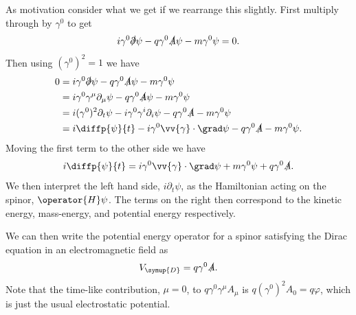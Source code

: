 \documentclass[fleqn]{NotesClass}
\newcommand{\dirac}{\symup{D}}
\begin{document}
    As motivation consider what we get if we rearrange this slightly.
    First multiply through by \(\gamma^0\) to get
    \begin{equation}
        i\gamma^0 \slashed{\partial}\psi - q\gamma^0\slashed{A}\psi - m\gamma^0\psi = 0.
    \end{equation}
    Then using \((\gamma^0)^2 = 1\) we have
    \begin{align}
        0 &= i\gamma^0\slashed{\partial}\psi - q\gamma^0\slashed{A}\psi - m\gamma^0\psi\\
        &= i\gamma^0\gamma^\mu\partial_\mu\psi - q\gamma^0\slashed{A}\psi - m\gamma^0\psi\\
        &= i(\gamma^0)^2\partial_t\psi - i\gamma^0\gamma^i\partial_i\psi - q\gamma^0\slashed{A} - m\gamma^0\psi\\
        &= i\diffp{\psi}{t} - i\gamma^0\vv{\gamma} \cdot \grad\psi - q\gamma^0 \slashed{A} - m\gamma^0\psi.
    \end{align}
    Moving the first term to the other side we have
    \begin{equation}
        i\diffp{\psi}{t} = i\gamma^0\vv{\gamma} \cdot \grad \psi + m\gamma^0\psi + q\gamma^0\slashed{A}.
    \end{equation}
    We then interpret the left hand side, \(i\partial_t \psi\), as the Hamiltonian acting on the spinor, \(\operator{H}\psi\).
    The terms on the right then correspond to the kinetic energy, mass-energy, and potential energy respectively.
    
    We can then write the potential energy operator for a spinor satisfying the Dirac equation in an electromagnetic field as
    \begin{equation}
        V_{\dirac} = q \gamma^0\slashed{A}.
    \end{equation}
    Note that the time-like contribution, \(\mu = 0\), to \(q\gamma^0\gamma^\mu A_\mu\) is \(q(\gamma^0)^2A_0 = q\varphi\), which is just the usual electrostatic potential.
    
\end{document}
